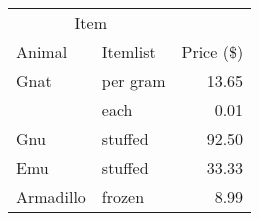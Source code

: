 \documentclass{book}
\begin{document}
\centering

\begin{tabular}{@{}llr@{}} \hline
\multicolumn{2}{c}{Item} \\ \cline{1-2}
Animal    & Itemlist & Price (\$)\\ \hline
Gnat      & per gram & 13.65 \\
          & each     & 0.01 \\
Gnu       & stuffed  & 92.50 \\
Emu       & stuffed  & 33.33 \\
Armadillo & frozen   & 8.99 \\ \hline
\end{tabular}
\end{document}

